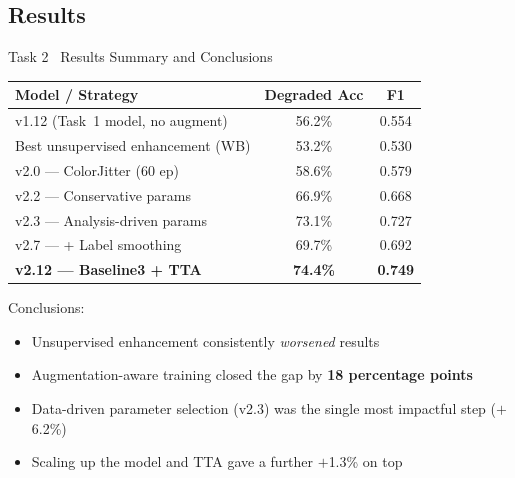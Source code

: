 \subsection{Results}
\begin{frame}{Task 2 \textendash\ Results Summary and Conclusions}
  \begin{center}
    \begin{tabular}{lcc}
      \toprule
      Model / Strategy & Degraded Acc & F1 \\
      \midrule
      v1.12 (Task~1 model, no augment) & 56.2\% & 0.554 \\
      Best unsupervised enhancement (WB) & 53.2\% & 0.530 \\
      v2.0 --- ColorJitter (60 ep) & 58.6\% & 0.579 \\
      v2.2 --- Conservative params & 66.9\% & 0.668 \\
      v2.3 --- Analysis-driven params & 73.1\% & 0.727 \\
      v2.7 --- + Label smoothing & 69.7\% & 0.692 \\
      \textbf{v2.12 --- Baseline3 + TTA} & \textbf{74.4\%} & \textbf{0.749} \\
      \bottomrule
    \end{tabular}
  \end{center}
  \vspace{0.5\baselineskip}
  Conclusions:
  \begin{itemize}
    \item Unsupervised enhancement consistently \textit{worsened} results
    \item Augmentation-aware training closed the gap by \textbf{18 percentage points}
    \item Data-driven parameter selection (v2.3) was the single most impactful step ($+$6.2\%)
    \item Scaling up the model and TTA gave a further $+$1.3\% on top
  \end{itemize}
\end{frame}
